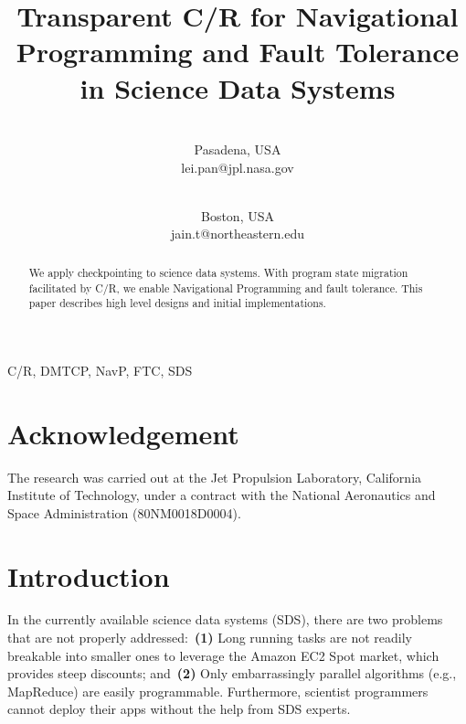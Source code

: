 \documentclass[conference]{IEEEtran}
\begin{document}
\title{Transparent C/R for Navigational Programming and Fault Tolerance in Science Data Systems}

\author{
 \\
Pasadena, USA\\
lei.pan@jpl.nasa.gov\\
\and
{}
 \\
Boston, USA\\
jain.t@northeastern.edu}

\maketitle


\begin{abstract}
We apply checkpointing to science data systems. With program state migration facilitated by C/R, we enable Navigational Programming and fault tolerance. This paper describes high level designs and initial implementations.
\end{abstract}

\begin{IEEEkeywords}
C/R, DMTCP, NavP, FTC, SDS
\end{IEEEkeywords}
\vspace{-2.2mm}

\section*{Acknowledgement}
The research was carried out at the Jet Propulsion Laboratory, California Institute of Technology, under a contract with the National Aeronautics and Space Administration (80NM0018D0004).

\section{Introduction}
\thispagestyle{FirstPage}
\label{sec:introduction}
In the currently available science data systems (SDS), there are two problems that are not properly addressed:~\textbf{(1)} Long running tasks are not readily breakable into smaller ones to leverage the Amazon EC2 Spot market, which provides steep discounts; and~\textbf{(2)} Only embarrassingly parallel algorithms (e.g., MapReduce) are easily programmable. Furthermore, scientist programmers cannot deploy their apps without the help from SDS experts.
\end{document}
